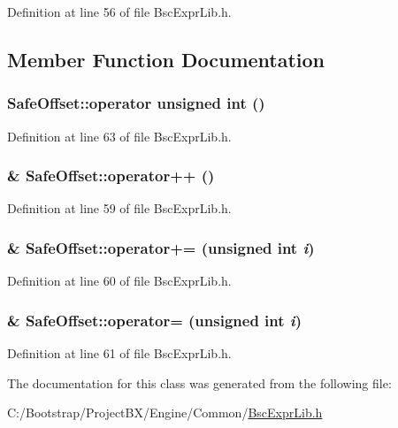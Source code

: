 Definition at line 56 of file BscExprLib.h.

\subsection{Member Function Documentation}
\hypertarget{class_safe_offset_4af35621921440301b85554ab0677e28}{
\subsubsection[{operator unsigned int}]{\setlength{\rightskip}{0pt plus 5cm}SafeOffset::operator unsigned int ()}}
\label{class_safe_offset_4af35621921440301b85554ab0677e28}




Definition at line 63 of file BscExprLib.h.\hypertarget{class_safe_offset_69d3d42a42aafbb45dfa01fa258e8c4a}{
\subsubsection[{operator++}]{\& SafeOffset::operator++ ()}}
\label{class_safe_offset_69d3d42a42aafbb45dfa01fa258e8c4a}




Definition at line 59 of file BscExprLib.h.\hypertarget{class_safe_offset_b0cde26da028cc7671b5c7f6de59d390}{
\subsubsection[{operator+=}]{\& SafeOffset::operator+= (unsigned int {\em i})}}
\label{class_safe_offset_b0cde26da028cc7671b5c7f6de59d390}




Definition at line 60 of file BscExprLib.h.\hypertarget{class_safe_offset_60468de7dceaf68aa7b675c9726933da}{
\subsubsection[{operator=}]{\& SafeOffset::operator= (unsigned int {\em i})}}
\label{class_safe_offset_60468de7dceaf68aa7b675c9726933da}




Definition at line 61 of file BscExprLib.h.

The documentation for this class was generated from the following file:\begin{CompactItemize}
\item 
C:/Bootstrap/ProjectBX/Engine/Common/\hyperlink{_bsc_expr_lib_8h}{BscExprLib.h}\end{CompactItemize}
